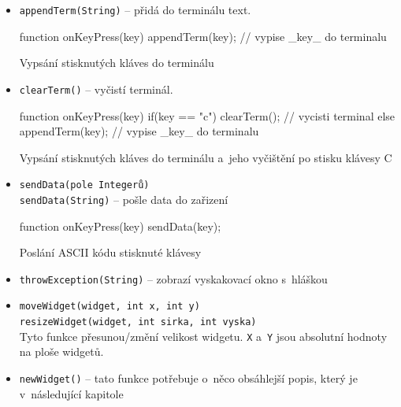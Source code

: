 \documentclass[12pt, a4paper, oneside]{article}
\begin{document}
\begin{itemize}
    \item {\color{blue}\verb/appendTerm(String)/} -- přidá do terminálu text.\\
        \begin{listing}[H]
        \begin{jscode}
function onKeyPress(key) {
    appendTerm(key); // vypise _key_ do terminalu
}
        \end{jscode}
        \caption{Vypsání stisknutých kláves do terminálu}
        \end{listing}

    \item {\color{blue}\verb/clearTerm()/} -- vyčistí terminál.\\
        \begin{listing}[H]
        \begin{jscode}
function onKeyPress(key) {
    if(key == "c")
        clearTerm(); // vycisti terminal
    else
        appendTerm(key); // vypise _key_ do terminalu
}
        \end{jscode}
        \caption{Vypsání stisknutých kláves do terminálu a~jeho vyčištění po stisku klávesy C}
        \end{listing}

    \item {\color{blue}\verb/sendData(pole Integerů)/} \\
         {\color{blue}\verb/sendData(String)/} -- pošle data do zařizení\\
        \begin{listing}[H]
        \begin{jscode}
function onKeyPress(key) {
    sendData(key);
}
        \end{jscode}
        \caption{Poslání ASCII kódu stisknuté klávesy}
        \end{listing}

    \item {\color{blue}\verb/throwException(String)/} -- zobrazí vyskakovací okno s~hláškou

    \item {\color{blue}\verb/moveWidget(widget, int x, int y)/} \\
    {\color{blue}\verb/resizeWidget(widget, int sirka, int vyska)/} \\
        Tyto funkce přesunou/změní velikost widgetu. \verb|X| a~\verb|Y| jsou absolutní hodnoty na ploše widgetů.

    \item {\color{blue}\verb/newWidget()/} -- tato funkce potřebuje o~něco obsáhlejší popis, který je v~následující kapitole
\end{itemize}
\end{document}
